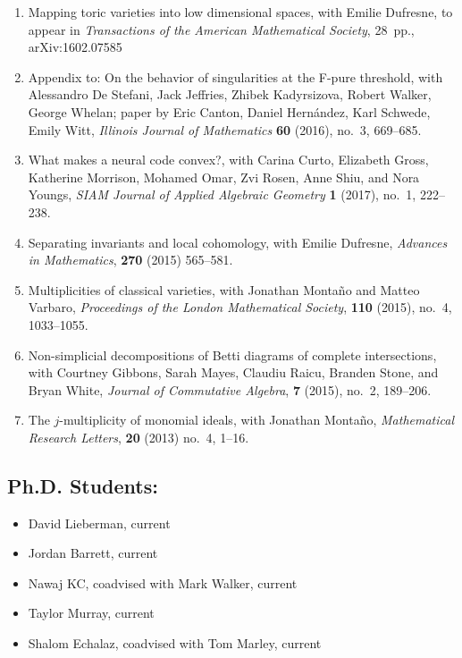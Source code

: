 \documentclass[11pt]{amsart}
\begin{document}
{\begin{enumerate}[leftmargin=9mm]
\item Mapping toric varieties into low dimensional spaces, with Emilie Dufresne, to appear in \emph{Transactions of the American Mathematical Society}, 28~pp., arXiv:1602.07585
\item Appendix to: On the behavior of singularities at the F-pure threshold, with Alessandro De Stefani, Jack Jeffries, Zhibek Kadyrsizova, Robert Walker, George Whelan; paper by Eric Canton, Daniel Hern\'andez, Karl Schwede, Emily Witt, \emph{Illinois Journal of Mathematics} \textbf{60} (2016), no.~3, 669--685.
\item What makes a neural code convex?, with Carina Curto, Elizabeth Gross, Katherine Morrison, Mohamed Omar, Zvi Rosen, Anne Shiu, and Nora Youngs, \emph{SIAM Journal of Applied Algebraic Geometry} \textbf{1} (2017), no.~1, 222--238.
\item Separating invariants and local cohomology, with Emilie Dufresne, \emph{Advances in Mathematics}, \textbf{270} (2015) 565--581.
\item \sloppy Multiplicities of classical varieties, with Jonathan Monta\~no and Matteo Varbaro, \emph{Proceedings of the London Mathematical Society}, {\bf 110} (2015), no.~4, 1033--1055.
\item Non-simplicial decompositions of Betti diagrams of complete intersections, with Courtney Gibbons, Sarah Mayes, Claudiu Raicu, Branden Stone, and Bryan White, \emph{Journal of Commutative Algebra}, \textbf{7} (2015), no.~2, 189--206.
\item The $j$-multiplicity of monomial ideals, with Jonathan Monta\~no, \emph{Mathematical Research Letters}, {\bf 20} (2013) no.~4, 1--16.
\end{enumerate}
}


\subsection*{Ph.D. Students:}
\begin{itemize}[leftmargin=9mm]
	\item David Lieberman, current
	\item Jordan Barrett, current
	\item Nawaj KC, coadvised with Mark Walker, current
	\item Taylor Murray, current
	\item Shalom Echalaz, coadvised with Tom Marley, current
	\end{itemize}

	
\end{document}
